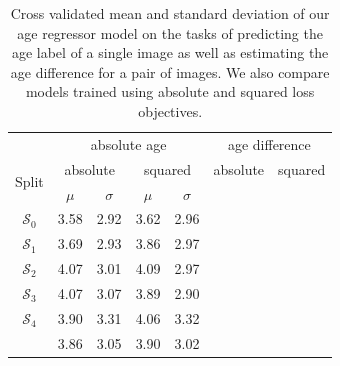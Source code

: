 \begin{table}[h]
	\begin{center}
		\begin{tabular}{c c c c c | c c c c}
			\toprule
			 & 
			\multicolumn{4}{c}{absolute age} & 
			\multicolumn{4}{c}{age difference} \\
			\cmidrule(lr){2-5}
			\cmidrule(lr){6-9}
			\multirow{2}{*}{Split} &
			\multicolumn{2}{c}{absolute} & 
			\multicolumn{2}{c}{squared} &
			\multicolumn{2}{c}{absolute} & 
			\multicolumn{2}{c}{squared} \\
			\cmidrule(lr){2-3}
			\cmidrule(lr){4-5}
			\cmidrule(lr){6-7}
			\cmidrule(lr){8-9}
			 & $\mu$ & $\sigma$ & $\mu$ & $\sigma$ \\ 
			\cmidrule(lr){1-9}
			$\mathcal{S}_0$ & 3.58 & 2.92 & 3.62 & 2.96 \\
			$\mathcal{S}_1$ & 3.69 & 2.93 & 3.86 & 2.97 \\
			$\mathcal{S}_2$ & 4.07 & 3.01 & 4.09 & 2.97 \\
			$\mathcal{S}_3$ & 4.07 & 3.07 & 3.89 & 2.90 \\
			$\mathcal{S}_4$ & 3.90 & 3.31 & 4.06 & 3.32 \\
			\cmidrule(lr){1-9}
			                & 3.86 & 3.05 & 3.90 & 3.02 \\
			\bottomrule
		\end{tabular}
		\caption{Cross validated mean and standard deviation of our age regressor model on the tasks of predicting the age label of a single image as well as estimating the age difference for a pair of images. We also compare models trained using absolute and squared loss objectives.}
		\label{tab:expregcrossval}
	\end{center}
\end{table}

